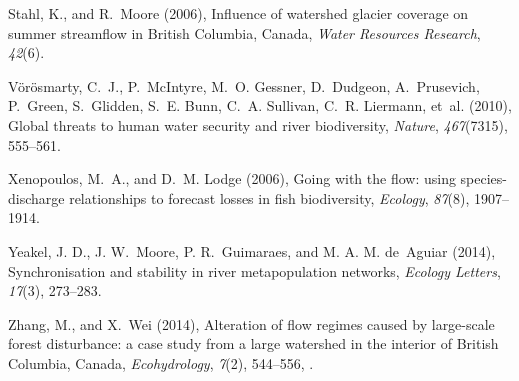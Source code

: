 \documentclass[linenumbers,draft]{AGUJournal}
\begin{document}
\begin{thebibliography}{30}
Stahl, K., and R.~Moore (2006), Influence of watershed glacier coverage on
  summer streamflow in {B}ritish {C}olumbia, {C}anada, \textit{Water Resources
  Research}, \textit{42}(6).

V{\"o}r{\"o}smarty, C.~J., P.~McIntyre, M.~O. Gessner, D.~Dudgeon,
  A.~Prusevich, P.~Green, S.~Glidden, S.~E. Bunn, C.~A. Sullivan, C.~R.
  Liermann, et~al. (2010), Global threats to human water security and river
  biodiversity, \textit{Nature}, \textit{467}(7315), 555--561.

Xenopoulos, M.~A., and D.~M. Lodge (2006), Going with the flow: using
  species-discharge relationships to forecast losses in fish biodiversity,
  \textit{Ecology}, \textit{87}(8), 1907--1914.

Yeakel, J. D., J. W.~Moore, P. R.~Guimaraes, and M. A. M. de~Aguiar (2014), Synchronisation and
  stability in river metapopulation networks, \textit{Ecology Letters},
  \textit{17}(3), 273--283.

Zhang, M., and X.~Wei (2014), Alteration of flow regimes caused by large-scale
  forest disturbance: a case study from a large watershed in the interior of
  {B}ritish {C}olumbia, {C}anada, \textit{Ecohydrology}, \textit{7}(2),
  544--556, .

\end{thebibliography}

%
\end{document}
